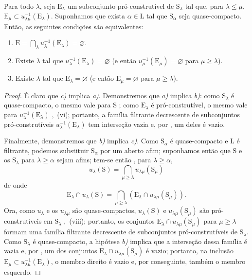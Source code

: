\begin{corollary}[8.3.3]
\label{IV.8.3.3}
Para todo $\lambda$, seja $\mathrm{E}_\lambda$ um subconjunto pró-construtível de $\mathrm{S}_\lambda$ tal que, para $\lambda\leqslant\mu$, $\mathrm{E}_\mu\subset u_{\lambda\mu}^{-1}(\mathrm{E}_\lambda)$.
Suponhamos que exista $\alpha\in\mathrm{L}$ tal que $\mathrm{S}_\alpha$ seja quase-compacto.
Então, as seguintes condições são equivalentes:
\begin{enumerate}[label=\emph{\alph*)}]
  \item $\mathrm{E}=\bigcap_\lambda u_\lambda^{-1}(\mathrm{E}_\lambda)=\varnothing$.
  \item Existe $\lambda$ tal que $u_\lambda^{-1}(\mathrm{E}_\lambda)=\varnothing$ (e então $u_\mu^{-1}(\mathrm{E}_\mu)=\varnothing$ para $\mu\geqslant\lambda$).
  \item Existe $\lambda$ tal que $\mathrm{E}_\lambda=\varnothing$ (e então $\mathrm{E}_\mu=\varnothing$ para $\mu\geqslant\lambda$).
\end{enumerate}
\end{corollary}

\begin{proof}
É claro que \emph{c)} implica \emph{a)}.
Demonstremos que \emph{a)} implica \emph{b)}: como $\mathrm{S}_\lambda$ é quase-compacto, o mesmo vale para $\mathrm{S}$ ; como $\mathrm{E}_\lambda$ é pró-construtível, o mesmo vale para $u_\lambda^{-1}(\mathrm{E}_\lambda)$ ,~(vi); portanto, a família filtrante decrescente de subconjuntos pró-construtíveis $u_\lambda^{-1}(\mathrm{E}_\lambda)$ tem interseção vazia e, por , um deles é vazio.

Finalmente, demonstremos que \emph{b)} implica \emph{c)}.
Como $\mathrm{S}_\alpha$ é quase-compacto e $\mathrm{L}$ é filtrante, podemos substituir $\mathrm{S}_\alpha$ por um aberto afim; suponhamos então  que $\mathrm{S}$ e os $\mathrm{S}_\lambda$ para $\lambda\geqslant\alpha$ sejam afins; tem-se então , para $\lambda\geqslant\alpha$,
\[
  u_\lambda(\mathrm{S})=\bigcap_{\mu\geqslant\lambda}u_{\lambda\mu}(\mathrm{S}_\mu)
\]
de onde
\[
  \mathrm{E}_\lambda\cap u_\lambda(\mathrm{S})=\bigcap_{\mu\geqslant\lambda}(\mathrm{E}_\lambda\cap u_{\lambda\mu}(\mathrm{S}_\mu)).
\]
Ora, como $u_\lambda$ e os $u_{\lambda\mu}$ são quase-compactos, $u_\lambda(\mathrm{S})$ e $u_{\lambda\mu}(\mathrm{S}_\mu)$ são pró-construtíveis em $\mathrm{S}_\lambda$ ,~(viii); portanto, os conjuntos $\mathrm{E}_\lambda\cap u_{\lambda\mu}(\mathrm{S}_\mu)$ para $\mu\geqslant\lambda$ formam uma família filtrante decrescente de subconjuntos pró-construtíveis de $\mathrm{S}_\lambda$.
Como $\mathrm{S}_\lambda$ é quase-compacto, a hipótese \emph{b)} implica que a interseção dessa família é vazia e, por , um dos conjuntos $\mathrm{E}_\lambda\cap u_{\lambda\mu}(\mathrm{S}_\mu)$ é vazio; portanto, na inclusão $\mathrm{E}_\mu\subset u_{\lambda\mu}^{-1}(\mathrm{E}_\lambda)$, o membro direito é vazio e, por conseguinte, também o membro esquerdo.
\end{proof}

